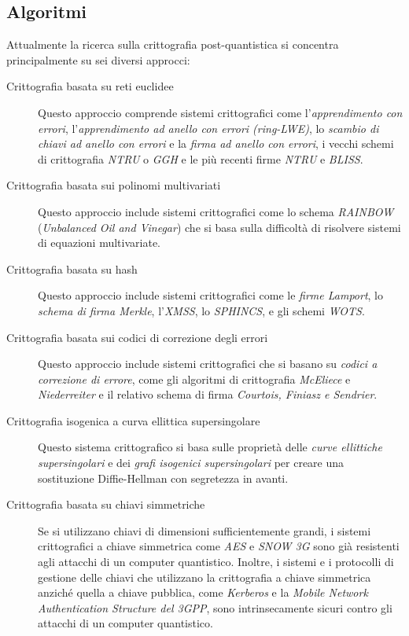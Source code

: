 \subsection{Algoritmi}
Attualmente la ricerca sulla crittografia post-quantistica si concentra principalmente su sei diversi approcci:
\begin{description}
  \item[Crittografia basata su reti euclidee] Questo approccio comprende sistemi crittografici come l'\textit{apprendimento con errori}, l'\textit{apprendimento ad anello con errori (ring-LWE)}, lo \textit{scambio di chiavi ad anello con errori} e la \textit{firma ad anello con errori}, i vecchi schemi di crittografia \textit{NTRU} o \textit{GGH} e le più recenti firme \textit{NTRU} e \textit{BLISS}.
  \item[Crittografia basata sui polinomi multivariati] Questo approccio include sistemi crittografici come lo schema \textit{RAINBOW} (\textit{Unbalanced Oil and Vinegar}) che si basa sulla difficoltà di risolvere sistemi di equazioni multivariate.
  \item[Crittografia basata su hash] Questo approccio include sistemi crittografici come le \textit{firme Lamport}, lo \textit{schema di firma Merkle}, l'\textit{XMSS}, lo \textit{SPHINCS}, e gli schemi \textit{WOTS}.
  \item[Crittografia basata sui codici di correzione degli errori] Questo approccio include sistemi crittografici che si basano su \textit{codici a correzione di errore}, come gli algoritmi di crittografia \textit{McEliece} e \textit{Niederreiter} e il relativo schema di firma \textit{Courtois, Finiasz e Sendrier}.
  \item[Crittografia isogenica a curva ellittica supersingolare] Questo sistema crittografico si basa sulle proprietà delle \textit{curve ellittiche supersingolari} e dei \textit{grafi isogenici supersingolari} per creare una sostituzione Diffie-Hellman con segretezza in avanti.
  \item[Crittografia basata su chiavi simmetriche] Se si utilizzano chiavi di dimensioni sufficientemente grandi, i sistemi crittografici a chiave simmetrica come \textit{AES} e \textit{SNOW 3G} sono già resistenti agli attacchi di un computer quantistico. Inoltre, i sistemi e i protocolli di gestione delle chiavi che utilizzano la crittografia a chiave simmetrica anziché quella a chiave pubblica, come \textit{Kerberos} e la \textit{Mobile Network Authentication Structure del 3GPP}, sono intrinsecamente sicuri contro gli attacchi di un computer quantistico.
\end{description}

